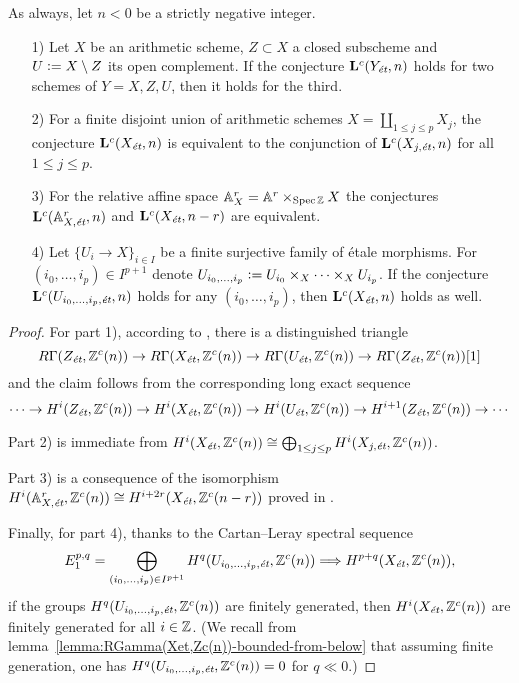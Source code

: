 \documentclass{article}
\numberwithin{equation}{section}
\begin{document}
\begin{lemma}
  \label{lemma:Lc(Xet)-operations}
  As always, let $n < 0$ be a strictly negative integer.

  \begin{enumerate}
  \item[1)] Let $X$ be an arithmetic scheme, $Z \subset X$ a closed subscheme
    and $U \dfn X\setminus Z$ its open complement. If the conjecture
    $\mathbf{L}^c (Y_\et,n)$ holds for two schemes of $Y = X,Z,U$, then it holds
    for the third.

  \item[2)] For a finite disjoint union of arithmetic schemes
    $X = \coprod_{1 \le j \le p} X_j$, the conjecture $\mathbf{L}^c (X_\et,n)$
    is equivalent to the conjunction of $\mathbf{L}^c (X_{j,\et},n)$ for all
    $1 \le j \le p$.

  \item[3)] For the relative affine space $\AA^r_X = \AA^r \times_{\Spec \ZZ} X$
    the conjectures $\mathbf{L}^c (\AA^r_{X,\et},n)$ and
    $\mathbf{L}^c (X_\et,n-r)$ are equivalent.

  \item[4)] Let $\{ U_i \to X \}_{i \in I}$ be a finite surjective family of
    étale morphisms. For $(i_0,\ldots,i_p) \in I^{p+1}$ denote
    $U_{i_0,\ldots,i_p} \dfn U_{i_0} \times_X \cdots \times_X U_{i_p}$.
    If the conjecture $\mathbf{L}^c (U_{i_0,\ldots,i_p, \et},n)$ holds for any
    $(i_0,\ldots,i_p)$, then $\mathbf{L}^c (X_\et,n)$ holds as well.
  \end{enumerate}

  \begin{proof}
    For part 1), according to \cite[Corollary~7.2]{Geisser-2010}, there is a
    distinguished triangle
    \[ R\Gamma (Z_\et, \ZZ^c (n)) \to
       R\Gamma (X_\et, \ZZ^c (n)) \to
       R\Gamma (U_\et, \ZZ^c (n)) \to
       R\Gamma (Z_\et, \ZZ^c (n)) [1] \]
    and the claim follows from the corresponding long exact sequence
    \[ \cdots \to H^i (Z_\et, \ZZ^c (n)) \to
       H^i (X_\et, \ZZ^c (n)) \to
       H^i (U_\et, \ZZ^c (n)) \to
       H^{i+1} (Z_\et, \ZZ^c (n)) \to \cdots \]

    Part 2) is immediate from
    $H^i (X_\et, \ZZ^c (n)) \cong \bigoplus_{1 \le j \le p} H^i (X_{j,\et}, \ZZ^c (n))$.

    Part 3) is a consequence of the isomorphism
    $H^i (\AA^r_{X,\et}, \ZZ^c (n)) \cong H^{i+2r} (X_\et, \ZZ^c (n-r))$
    proved in \cite[Lemma~5.11]{Morin-2014}.

    Finally, for part 4), thanks to the Cartan--Leray spectral sequence
    $$E_1^{p,q} = \bigoplus_{(i_0,\ldots,i_p) \in I^{p+1}} H^q (U_{i_0,\ldots,i_p, \et}, \ZZ^c (n)) \Longrightarrow H^{p+q} (X_\et, \ZZ^c (n)),$$
    if the groups $H^q (U_{i_0,\ldots,i_p, \et}, \ZZ^c (n))$ are finitely
    generated, then $H^i (X_\et, \ZZ^c (n))$ are finitely generated for all
    $i\in \ZZ$. (We recall from
    lemma~\ref{lemma:RGamma(Xet,Zc(n))-bounded-from-below} that assuming finite
    generation, one has $H^q (U_{i_0,\ldots,i_p, \et}, \ZZ^c (n)) = 0$ for
    $q \ll 0$.)
  \end{proof}
\end{lemma}
\end{document}
